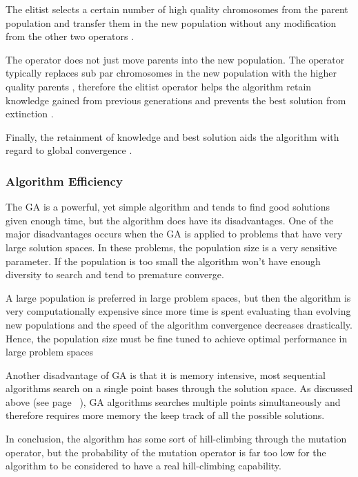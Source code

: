 The elitist selects a certain number of high quality chromosomes from the parent population and transfer them in the new population without any modification from the other two operators \cite{PatternDetectionGA}. 

The operator does not just move parents into the new population. The operator typically replaces sub par chromosomes in the new population with the higher quality parents \cite{RealParameterGASA}, therefore the elitist operator helps the algorithm retain knowledge gained from previous generations and prevents the best solution from extinction \cite{DynamicPenaltyGA}. 

Finally, the retainment of knowledge and best solution aids the algorithm with regard to global convergence \cite{SelfAdaptiveDataMiningGA}.

\subsubsection{Algorithm Efficiency}
The GA is a powerful, yet simple algorithm and tends to find good solutions given enough time, but the algorithm does have its disadvantages. One of the major disadvantages occurs when the GA is applied to problems that have very large solution spaces. In these problems, the population size is a very sensitive parameter\cite{AdaptiveGA,HetergeneousGA,SelfAdaptiveDataMiningGA,PatternDetectionGA}. If the population is too small the algorithm won't have enough diversity to search and tend to premature converge. 

A large population is preferred in large problem spaces, but then the algorithm is very computationally expensive since more time is spent evaluating than evolving new populations and the speed of the algorithm convergence decreases drastically. Hence, the population size must be fine tuned to achieve optimal performance in large problem spaces \cite{AdaptiveGA,CompuIntelligenceIntro}

Another disadvantage of GA is that it is memory intensive, most sequential algorithms search on a single point bases through the solution space. As discussed above (see page ~\pageref{GASearchPoints}), GA algorithms searches multiple points simultaneously and therefore requires more memory the keep track of all the possible solutions.

In conclusion, the algorithm has some sort of hill-climbing through the mutation operator, but the probability of the mutation operator is far too low for the algorithm to be considered to have a real hill-climbing capability.

